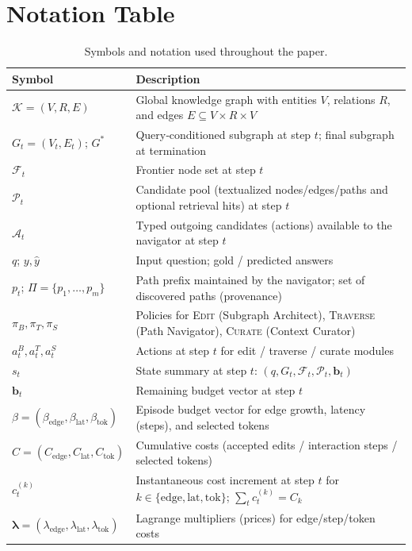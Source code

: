 \documentclass{article} %
\begin{document}
\newpage
\section{Notation Table}
\label{app:notation}
\begin{table}[H]
\centering
\caption{Symbols and notation used throughout the paper.}
\label{tab:notation}
\begin{tabularx}{\textwidth}{@{}lL@{}}
\toprule
\textbf{Symbol} & \textbf{Description} \\
\midrule
$\mathcal{K}=(V,R,E)$ & Global knowledge graph with entities $V$, relations $R$, and edges $E\subseteq V\times R\times V$ \\
$G_t=(V_t,E_t)$; $G^\ast$ & Query‑conditioned subgraph at step $t$; final subgraph at termination \\
$\mathcal{F}_t$ & Frontier node set at step $t$ \\
$\mathcal{P}_t$ & Candidate pool (textualized nodes/edges/paths and optional retrieval hits) at step $t$ \\
$\mathcal{A}_t$ & Typed outgoing candidates (actions) available to the navigator at step $t$ \\
$q$; $y,\hat y$ & Input question; gold / predicted answers \\
$p_t$; $\Pi=\{p_1,\dots,p_m\}$ & Path prefix maintained by the navigator; set of discovered paths (provenance) \\
$\pi_B,\pi_T,\pi_S$ & Policies for \textsc{Edit} (Subgraph Architect), \textsc{Traverse} (Path Navigator), \textsc{Curate} (Context Curator) \\
$a_t^B,a_t^T,a_t^S$ & Actions at step $t$ for edit / traverse / curate modules \\
$s_t$ & State summary at step $t$: $(q, G_t, \mathcal{F}_t, \mathcal{P}_t, \mathbf{b}_t)$ \\
$\mathbf{b}_t$ & Remaining budget vector at step $t$ \\
$\beta=(\beta_{\text{edge}},\beta_{\text{lat}},\beta_{\text{tok}})$ & Episode budget vector for edge growth, latency (steps), and selected tokens \\
$C=(C_{\text{edge}},C_{\text{lat}},C_{\text{tok}})$ & Cumulative costs (accepted edits / interaction steps / selected tokens) \\
$c_t^{(k)}$ & Instantaneous cost increment at step $t$ for $k\in\{\text{edge},\text{lat},\text{tok}\}$; $\sum_t c_t^{(k)}=C_k$ \\
$\boldsymbol{\lambda}=(\lambda_{\text{edge}},\lambda_{\text{lat}},\lambda_{\text{tok}})$ & Lagrange multipliers (prices) for edge/step/token costs \\

\end{tabularx}
\end{table}
\end{document}
